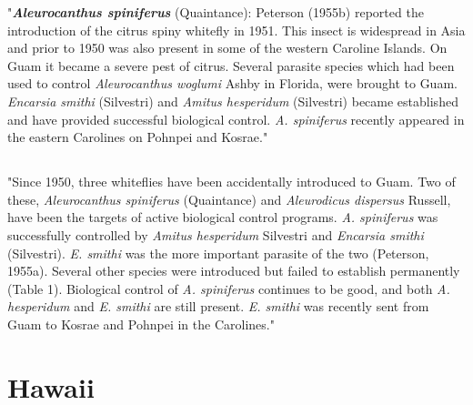 \documentclass[]{scrartcl}
\begin{document}
"\textit{\textbf{Aleurocanthus spiniferus}} (Quaintance): Peterson (1955b) reported the introduction of the citrus spiny whitefly in 1951. This insect is widespread in Asia and prior to 1950 was also present in some of the western Caroline Islands. On Guam it became a severe pest of citrus. Several parasite species which had been used to control \textit{Aleurocanthus woglumi} Ashby in Florida, were brought to Guam. \textit{Encarsia smithi} (Silvestri) and \textit{Amitus hesperidum} (Silvestri) became established and have provided successful biological control. \textit{A. spiniferus} recently appeared in the eastern Carolines on Pohnpei and Kosrae."

\subsection{}

"Since 1950, three whiteflies have been accidentally introduced to Guam. Two of these, \textit{Aleurocanthus spiniferus} (Quaintance) and \textit{Aleurodicus dispersus} Russell, have been the targets of active biological control programs. \textit{A. spiniferus} was successfully controlled by \textit{Amitus hesperidum} Silvestri and \textit{Encarsia smithi} (Silvestri). \textit{E. smithi} was the more important parasite of the two (Peterson, 1955a). Several other species were introduced but failed to establish permanently (Table 1). Biological control of \textit{A. spiniferus} continues to be good, and both \textit{A. hesperidum} and \textit{E. smithi} are still present. \textit{E. smithi} was recently sent from Guam to Kosrae and Pohnpei in the Carolines."

\subsection{}

\subsection{}

\subsection{}

\section{Hawaii}
\end{document}
